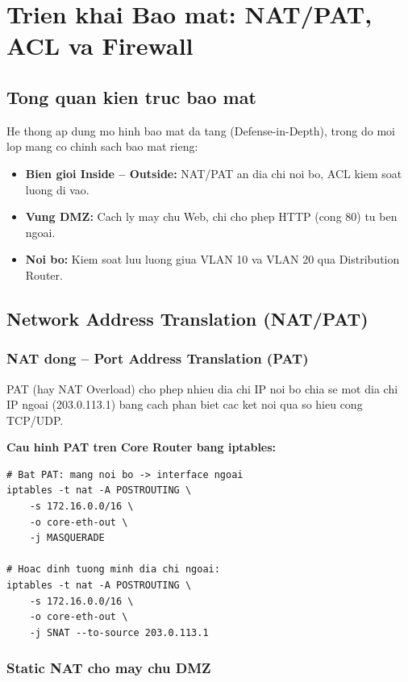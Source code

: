 \chapter{Trien khai Bao mat: NAT/PAT, ACL va Firewall}

\section{Tong quan kien truc bao mat}

He thong ap dung mo hinh bao mat da tang (Defense-in-Depth), trong do moi lop mang co chinh sach bao mat rieng:

\begin{itemize}
    \item \textbf{Bien gioi Inside -- Outside:} NAT/PAT an dia chi noi bo, ACL kiem soat luong di vao.
    \item \textbf{Vung DMZ:} Cach ly may chu Web, chi cho phep HTTP (cong 80) tu ben ngoai.
    \item \textbf{Noi bo:} Kiem soat luu luong giua VLAN 10 va VLAN 20 qua Distribution Router.
\end{itemize}

\section{Network Address Translation (NAT/PAT)}

\subsection{NAT dong -- Port Address Translation (PAT)}

PAT (hay NAT Overload) cho phep nhieu dia chi IP noi bo chia se mot dia chi IP ngoai (203.0.113.1) bang cach phan biet cac ket noi qua so hieu cong TCP/UDP.

\textbf{Cau hinh PAT tren Core Router bang iptables:}

\begin{lstlisting}
# Bat PAT: mang noi bo -> interface ngoai
iptables -t nat -A POSTROUTING \
    -s 172.16.0.0/16 \
    -o core-eth-out \
    -j MASQUERADE

# Hoac dinh tuong minh dia chi ngoai:
iptables -t nat -A POSTROUTING \
    -s 172.16.0.0/16 \
    -o core-eth-out \
    -j SNAT --to-source 203.0.113.1
\end{lstlisting}

\subsection{Static NAT cho may chu DMZ}

